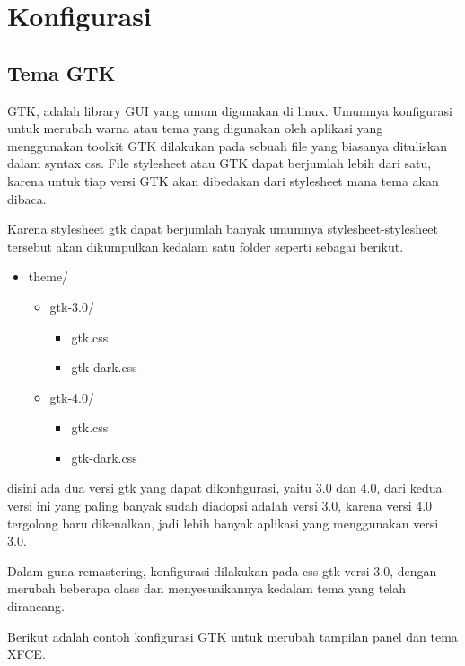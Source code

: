 \documentclass[8pt, a4paper]{article}
\date{}
\begin{document}
\section{Konfigurasi}

\subsection{Tema GTK}

GTK, adalah library GUI yang umum digunakan di linux. Umumnya konfigurasi untuk
merubah warna atau tema yang digunakan oleh aplikasi yang menggunakan toolkit GTK
dilakukan pada sebuah file yang biasanya dituliskan dalam syntax css. File stylesheet
atau GTK dapat berjumlah lebih dari satu, karena untuk tiap versi GTK akan dibedakan
dari stylesheet mana tema akan dibaca.

Karena stylesheet gtk dapat berjumlah banyak umumnya stylesheet-stylesheet
tersebut akan dikumpulkan kedalam satu folder seperti sebagai berikut.

\begin{itemize}
  \item theme/
  \begin{itemize}
    \item gtk-3.0/
    \begin{itemize}
      \item gtk.css
      \item gtk-dark.css 
    \end{itemize}
    \item gtk-4.0/
    \begin{itemize}
      \item gtk.css
      \item gtk-dark.css 
    \end{itemize}
  \end{itemize}
\end{itemize}

disini ada dua versi gtk yang dapat dikonfigurasi, yaitu 3.0 dan 4.0, dari
kedua versi ini yang paling banyak sudah diadopsi adalah versi 3.0, karena
versi 4.0 tergolong baru dikenalkan, jadi lebih banyak aplikasi yang menggunakan
versi 3.0.

Dalam guna remastering, konfigurasi dilakukan pada css gtk versi 3.0, dengan
merubah beberapa class dan menyesuaikannya kedalam tema yang telah dirancang.

Berikut adalah contoh konfigurasi GTK untuk merubah tampilan panel dan tema XFCE.
\end{document}
